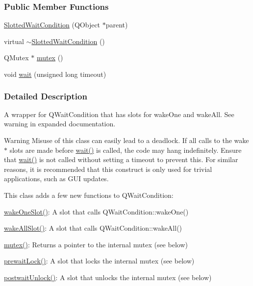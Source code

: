\subsubsection*{Public Member Functions}
\begin{DoxyCompactItemize}
\item 
\hyperlink{classGlobalSearch_1_1SlottedWaitCondition_a4fd4c5343242d8961fd893012ba9f54b}{Slotted\+Wait\+Condition} (Q\+Object $\ast$parent)
\item 
virtual \hyperlink{classGlobalSearch_1_1SlottedWaitCondition_a5b504c643c03b6b9e2e30e4a7613f43c}{$\sim$\+Slotted\+Wait\+Condition} ()
\item 
Q\+Mutex $\ast$ \hyperlink{classGlobalSearch_1_1SlottedWaitCondition_af548d9a604d2ec84083e5c92ca1a3849}{mutex} ()
\item 
void \hyperlink{classGlobalSearch_1_1SlottedWaitCondition_a30999486ab4737cda3c4e93f8625ac1f}{wait} (unsigned long timeout)
\end{DoxyCompactItemize}


\subsubsection{Detailed Description}
A wrapper for Q\+Wait\+Condition that has slots for wake\+One and wake\+All. See warning in expanded documentation. 

\begin{DoxyWarning}{Warning}
Misuse of this class can easily lead to a deadlock. If all calls to the wake$\ast$ slots are made before \hyperlink{classGlobalSearch_1_1SlottedWaitCondition_a30999486ab4737cda3c4e93f8625ac1f}{wait()} is called, the code may hang indefinitely. Ensure that \hyperlink{classGlobalSearch_1_1SlottedWaitCondition_a30999486ab4737cda3c4e93f8625ac1f}{wait()} is not called without setting a timeout to prevent this. For similar reasons, it is recommended that this construct is only used for trivial applications, such as G\+U\+I updates.
\end{DoxyWarning}
This class adds a few new functions to Q\+Wait\+Condition\+:
\begin{DoxyItemize}
\item \hyperlink{classGlobalSearch_1_1SlottedWaitCondition_a26b060dde9c49345da5fe1c8dbd3374c}{wake\+One\+Slot()}\+: A slot that calls Q\+Wait\+Condition\+::wake\+One()
\item \hyperlink{classGlobalSearch_1_1SlottedWaitCondition_a4024066fe5db52f2e2c9257fcfbb5320}{wake\+All\+Slot()}\+: A slot that calls Q\+Wait\+Condition\+::wake\+All()
\item \hyperlink{classGlobalSearch_1_1SlottedWaitCondition_af548d9a604d2ec84083e5c92ca1a3849}{mutex()}\+: Returns a pointer to the internal mutex (see below)
\item \hyperlink{classGlobalSearch_1_1SlottedWaitCondition_afb1ba4315ffa2de59eaf5045d2a4c09f}{prewait\+Lock()}\+: A slot that locks the internal mutex (see below)
\item \hyperlink{classGlobalSearch_1_1SlottedWaitCondition_a3c9f9e3ba7eebdc3cc270445385e334c}{postwait\+Unlock()}\+: A slot that unlocks the internal mutex (see below)
\end{DoxyItemize}


